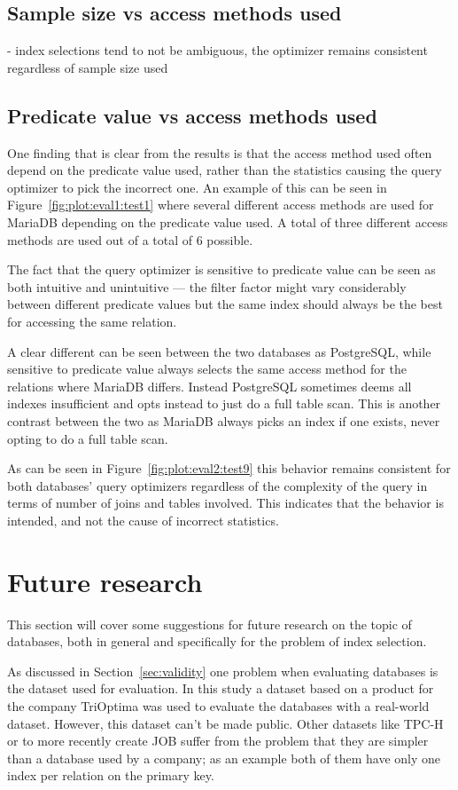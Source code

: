 \subsection{Sample size vs access methods used}
- index selections tend to not be ambiguous, the optimizer remains consistent
regardless of sample size used

\subsection{Predicate value vs access methods used}
One finding that is clear from the results is that the access method used often
depend on the predicate value used, rather than the statistics causing the query
optimizer to pick the incorrect one. An example of this can be seen in
Figure~\ref{fig:plot:eval1:test1} where several different access methods are
used for MariaDB depending on the predicate value used. A total of three
different access methods are used out of a total of 6 possible.

The fact that the query optimizer is sensitive to predicate value can be seen as
both intuitive and unintuitive --- the filter factor might vary considerably
between different predicate values but the same index should always be the best
for accessing the same relation.

A clear different can be seen between the two databases as PostgreSQL, while
sensitive to predicate value always selects the same access method for the
relations where MariaDB differs. Instead PostgreSQL sometimes deems all indexes
insufficient and opts instead to just do a full table scan. This is another
contrast between the two as MariaDB always picks an index if one exists, never
opting to do a full table scan.

As can be seen in Figure~\ref{fig:plot:eval2:test9} this behavior remains
consistent for both databases' query optimizers regardless of the complexity of
the query in terms of number of joins and tables involved. This indicates that
the behavior is intended, and not the cause of incorrect statistics.

\section{Future research}
This section will cover some suggestions for future research on the topic of
databases, both in general and specifically for the problem of index selection.

As discussed in Section~\ref{sec:validity} one problem when evaluating
databases is the dataset used for evaluation. In this study a dataset based on a
product for the company TriOptima was used to evaluate the databases with a real-world
dataset. However, this dataset can't be made public. Other datasets like TPC-H
or to more recently create JOB suffer from the problem that they are simpler
than a database used by a company; as an example both of them have only one
index per relation on the primary key.

